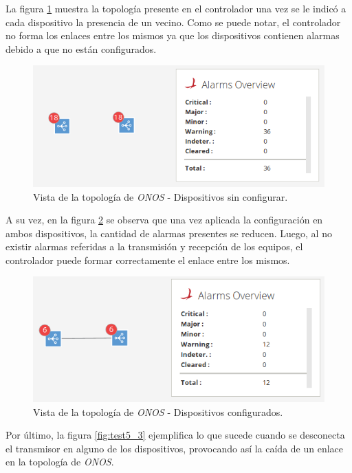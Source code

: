   La figura \ref{fig:test5_1} muestra la topología presente en el controlador una vez se le indicó a cada dispositivo la presencia de un vecino. Como se puede notar, el controlador no forma los enlaces entre los mismos ya que los dispositivos contienen alarmas debido a que no están configurados. 

  \begin{figure}[H]
	\centering
	\includegraphics[scale=0.5]{Figures/test5_1.png}
	\caption{Vista de la topología de \textit{ONOS} - Dispositivos sin configurar.}
	\label{fig:test5_1}
  \end{figure}

  A su vez, en la figura \ref{fig:test5_2} se observa que una vez aplicada la configuración en ambos dispositivos, la cantidad de alarmas presentes se reducen. Luego, al no existir alarmas referidas a la transmisión y recepción de los equipos, el controlador puede formar correctamente el enlace entre los mismos. 

  \begin{figure}[H]
	\centering
	\includegraphics[scale=0.5]{Figures/test5_2.png}
	\caption{Vista de la topología de \textit{ONOS} - Dispositivos configurados.}
	\label{fig:test5_2}
  \end{figure}

  Por último, la figura \ref{fig:test5_3} ejemplifica lo que sucede cuando se desconecta el transmisor en alguno de los dispositivos, provocando así la caída de un enlace en la topología de \textit{ONOS}.

